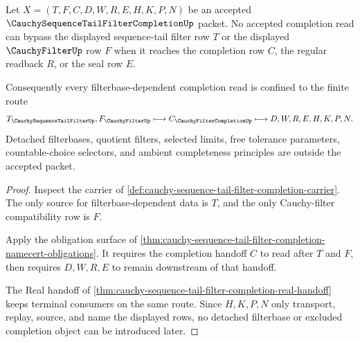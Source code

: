 \begin{theorem}
\label{thm:cauchy-sequence-tail-filter-completion-filterbase-nonescape}
Let $X=(T,F,C,D,W,R,E,H,K,P,N)$ be an accepted $\CauchySequenceTailFilterCompletionUp$ packet. No accepted completion read can bypass the displayed sequence-tail filter row $T$ or the displayed $\CauchyFilterUp$ row $F$ when it reaches the completion row $C$, the regular readback $R$, or the seal row $E$.

Consequently every filterbase-dependent completion read is confined to the finite route
$$
T_{\CauchySequenceTailFilterUp},F_{\CauchyFilterUp} \longmapsto C_{\CauchyFilterCompletionUp} \longmapsto D,W,R,E,H,K,P,N .
$$
Detached filterbases, quotient filters, selected limits, free tolerance parameters, countable-choice selectors, and ambient completeness principles are outside the accepted packet.
\end{theorem}
\begin{proof}
Inspect the carrier of \autoref{def:cauchy-sequence-tail-filter-completion-carrier}. The only source for filterbase-dependent data is $T$, and the only Cauchy-filter compatibility row is $F$.

Apply the obligation surface of \autoref{thm:cauchy-sequence-tail-filter-completion-namecert-obligations}. It requires the completion handoff $C$ to read after $T$ and $F$, then requires $D,W,R,E$ to remain downstream of that handoff.

The Real handoff of \autoref{thm:cauchy-sequence-tail-filter-completion-real-handoff} keeps terminal consumers on the same route. Since $H,K,P,N$ only transport, replay, source, and name the displayed rows, no detached filterbase or excluded completion object can be introduced later.
\end{proof}



